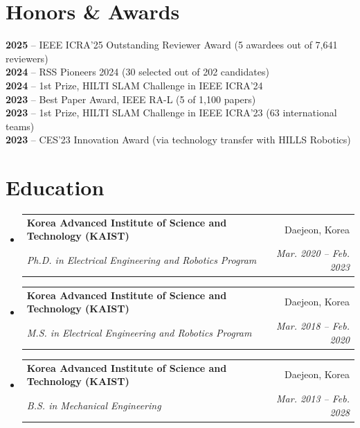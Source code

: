 \documentclass[letterpaper,10pt]{article}
\makeatletter
\newcommand{\resumeSubheading}[4]{
  \vspace{-3pt}\item
    \begin{tabular*}{0.97\textwidth}[t]{l@{\extracolsep{\fill}}r}
      \textbf{#1} & #2 \\
      \textit{\small#3} & \textit{\small #4} \\
    \end{tabular*}\vspace{-9pt}
}
\newcommand{\resumeSubHeadingListStart}{\begin{itemize}[leftmargin=0.15in, label={}]}
\newcommand{\resumeSubHeadingListEnd}{\end{itemize}}
\makeatother
\begin{document}
\section{Honors \& Awards}
 \begin{itemize}[leftmargin=0.15in, label={}]
    \small{\item{
     \textbf{2025} -- IEEE ICRA'25 Outstanding Reviewer Award (5 awardees out of 7,641 reviewers) \\
     \textbf{2024} -- RSS Pioneers 2024 (30 selected out of 202 candidates) \\
     \textbf{2024} -- 1st Prize, HILTI SLAM Challenge in IEEE ICRA'24 \\
     \textbf{2023} -- Best Paper Award, IEEE RA-L (5 of 1,100 papers) \\
     \textbf{2023} -- 1st Prize, HILTI SLAM Challenge in IEEE ICRA'23 (63 international teams) \\
     \textbf{2023} -- CES'23 Innovation Award (via technology transfer with HILLS Robotics)
    }}
 \end{itemize}


\section{Education}
  \resumeSubHeadingListStart
    \resumeSubheading
      {Korea Advanced Institute of Science and Technology (KAIST)}{Daejeon, Korea}
      {Ph.D. in Electrical Engineering and Robotics Program}{Mar. 2020 -- Feb. 2023}
    \resumeSubheading
      {Korea Advanced Institute of Science and Technology (KAIST)}{Daejeon, Korea}
      {M.S. in Electrical Engineering and Robotics Program}{Mar. 2018 -- Feb. 2020}
    \resumeSubheading
      {Korea Advanced Institute of Science and Technology (KAIST)}{Daejeon, Korea}
      {B.S. in Mechanical Engineering}{Mar. 2013 -- Feb. 2028}

  \resumeSubHeadingListEnd


\end{document}
